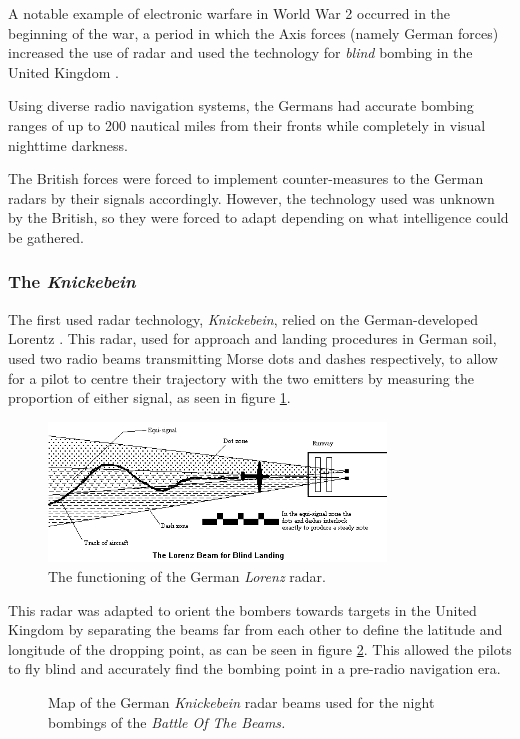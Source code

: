 \documentclass[english,purist]{ist-report}
\begin{document}
A notable example of electronic warfare in World War 2 occurred in the beginning of the war, a period in which the Axis forces (namely German forces) increased the use of radar and used the technology for \textit{blind} bombing in the United Kingdom \cite{wizardwar}.

Using diverse radio navigation systems, the Germans had accurate bombing ranges of up to 200 nautical miles from their fronts while completely in visual nighttime darkness.

The British forces were forced to implement counter-measures to the German radars by \jamming{} their signals accordingly. However, the technology used was unknown by the British, so they were forced to adapt depending on what intelligence could be gathered.

\subsubsection{The \textit{Knickebein}}

The first used radar technology, \textit{Knickebein}, relied on the German-developed Lorentz \cite{pentagonknickebein}. This radar, used for approach and landing procedures in German soil, used two radio beams transmitting Morse dots and dashes respectively, to allow for a pilot to centre their trajectory with the two emitters by measuring the proportion of either signal, as seen in figure \ref{fig:lorenz}.
\begin{figure}[ht]
    \centering
    \includegraphics[width = 0.8\textwidth,trim = {0 8mm 0 0}, clip]{lorenz}
    \caption{The functioning of the German \textit{Lorenz} radar.}
    \label{fig:lorenz}
\end{figure}

This radar was adapted to orient the bombers towards targets in the United Kingdom by separating the beams far from each other to define the latitude and longitude of the dropping point, as can be seen in figure \ref{fig:botb_map}. This allowed the pilots to fly blind and accurately find the bombing point in a pre-radio navigation era.
\begin{figure}[ht]
    \centering
    {\tiny }
    \caption{Map of the German \textit{Knickebein} radar beams used for the night bombings of the \textit{Battle Of The Beams.}}
    \label{fig:botb_map}
\end{figure}
\end{document}
